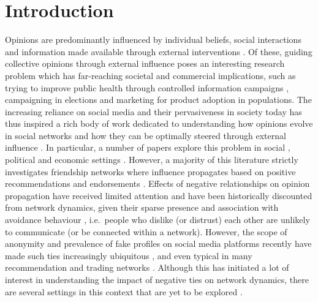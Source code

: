 \section{Introduction}
\label{sec:introduction}
Opinions are predominantly influenced by individual beliefs, social interactions and information made available through external interventions \cite{myers1996social,watts2007influentials}. Of these, guiding collective opinions through external influence poses an interesting research problem which has far-reaching societal and commercial implications, such as trying to improve public health through controlled information campaigns \cite{wilder2018end}, campaigning in elections \cite{ranganath2016understanding} and marketing for product adoption \cite{watts2007viral} in populations.
The increasing reliance on social media and their pervasiveness in society today \cite{perrin2015social} has thus inspired a rich body of work dedicated to understanding how opinions evolve in social networks and how they can be optimally steered through external influence \cite{banerjee2020survey,noorazar2020recent}.
In particular, a number of papers explore this problem in social \cite{kiss2017mathematics,pastor2015epidemic}, political \cite{galam1999application} and economic settings \cite{easley2010networks,jackson2010social}. However, a majority of this literature strictly investigates friendship networks where influence propagates based on positive recommendations and endorsements \cite{newman2003structure}. Effects of negative relationships on opinion propagation have received limited attention and have been historically discounted from network dynamics, given their sparse presence \cite{offer2021negative} and association with avoidance behaviour \cite{harrigan2017avoidance}, i.e.~people who dislike (or distrust) each other are unlikely to communicate (or be connected within a network). However, the scope of anonymity and prevalence of fake profiles on social media platforms recently have made such ties increasingly ubiquitous \cite{bae2012sentiment,pfeffer2014understanding}, and even typical in many recommendation and trading networks \cite{guha2004propagation,leskovec2010signed}. Although this has initiated a lot of interest in understanding the impact of negative ties on network dynamics, there are several settings in this context that are yet to be explored \cite{offer2021negative}. 

